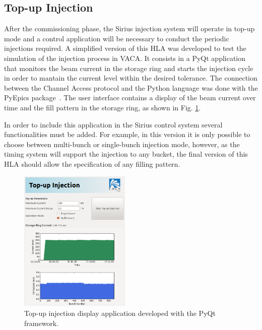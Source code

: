 \subsection{Top-up Injection}

After the commissioning phase, the Sirius injection system will operate in top-up mode 
and a control application will be necessary to conduct the periodic injections required.
A simplified version of this HLA was developed to test the simulation of the injection process in VACA.
It consists in a PyQt application that monitors the beam current in the storage ring and starts the injection cycle
in order to mantain the current level within the desired tolerance. The connection between 
the Channel Access protocol and the Python language was done with the PyEpics package~\cite{pyepics}.
The user interface contains a display of the beam current over time and the fill pattern in the storage ring, as shown in Fig. \ref{fig:topup}.

In order to include this application in the Sirius control system several functionalities must be added. For example, in this version it is only possible to 
choose between multi-bunch or single-bunch injection mode, however, as the timing system will support the injection to any bucket, 
the final version of this HLA should allow the specification of any filling pattern.


\begin{figure}[!htb]
   \centering
   \includegraphics*[width=150pt]{WEPOPRPO22f4}
   \caption{Top-up injection display application developed with the PyQt framework.}
   \label{fig:topup}
\end{figure}

